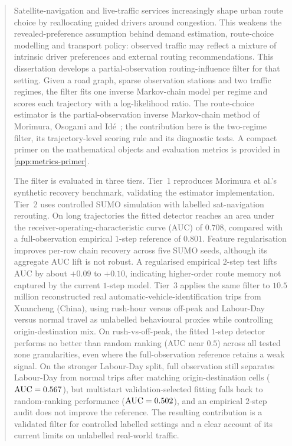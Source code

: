 \begin{abstract}
\noindent Satellite-navigation and live-traffic services increasingly shape urban route choice by reallocating guided drivers around congestion. This weakens the revealed-preference assumption behind demand estimation, route-choice modelling and transport policy: observed traffic may reflect a mixture of intrinsic driver preferences and external routing recommendations. This dissertation develops a partial-observation routing-influence filter for that setting. Given a road graph, sparse observation stations and two traffic regimes, the filter fits one inverse Markov-chain model per regime and scores each trajectory with a log-likelihood ratio. The route-choice estimator is the partial-observation inverse Markov-chain method of Morimura, Osogami and Id\'e~\cite{morimura2013}; the contribution here is the two-regime filter, its trajectory-level scoring rule and its diagnostic tests. A compact primer on the mathematical objects and evaluation metrics is provided in \cref{app:metrics-primer}.

The filter is evaluated in three tiers. Tier~1 reproduces Morimura et al.'s synthetic recovery benchmark, validating the estimator implementation. Tier~2 uses controlled SUMO simulation with labelled sat-navigation rerouting. On long trajectories the fitted detector reaches an area under the receiver-operating-characteristic curve (AUC) of $0.708$, compared with a full-observation empirical $1$-step reference of $0.801$. Feature regularisation improves per-row chain recovery across five SUMO seeds, although its aggregate AUC lift is not robust. A regularised empirical $2$-step test lifts AUC by about $+0.09$ to $+0.10$, indicating higher-order route memory not captured by the current $1$-step model. Tier~3 applies the same filter to $10.5$ million reconstructed real automatic-vehicle-identification trips from Xuancheng (China), using rush-hour versus off-peak and Labour-Day versus normal travel as unlabelled behavioural proxies while controlling origin-destination mix. On rush-vs-off-peak, the fitted $1$-step detector performs no better than random ranking (AUC near $0.5$) across all tested zone granularities, even where the full-observation reference retains a weak signal. On the stronger Labour-Day split, full observation still separates Labour-Day from normal trips after matching origin-destination cells ($\AUC=0.567$), but multistart validation-selected fitting falls back to random-ranking performance ($\AUC=0.502$), and an empirical $2$-step audit does not improve the reference. The resulting contribution is a validated filter for controlled labelled settings and a clear account of its current limits on unlabelled real-world traffic.
\end{abstract}
